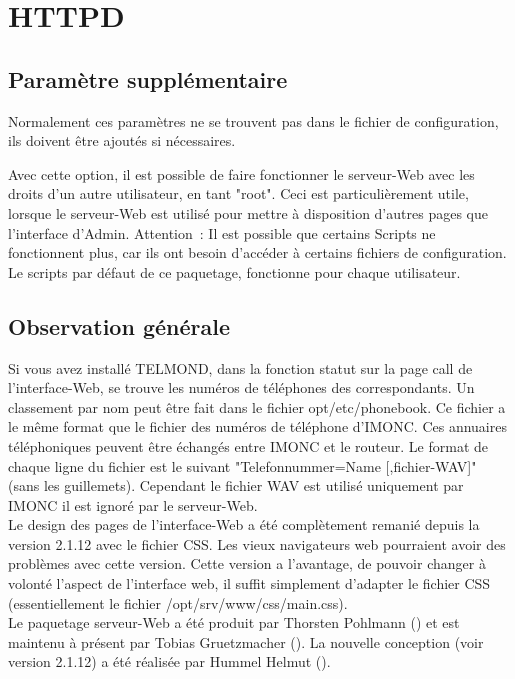 
\section {HTTPD}

\subsection{Paramètre supplémentaire}

Normalement ces paramètres ne se trouvent pas dans le fichier de configuration,
ils doivent être ajoutés si nécessaires.

\begin{description}
    {Avec cette option, il est possible de faire fonctionner le serveur-Web 
    avec les droits d'un autre utilisateur, en tant "root". Ceci est particulièrement 
    utile, lorsque le serveur-Web est utilisé pour mettre à disposition d'autres 
    pages que l'interface d'Admin. Attention~: Il est possible que certains 
    Scripts ne fonctionnent plus, car ils ont besoin d'accéder à certains fichiers 
    de configuration. Le scripts par défaut de ce paquetage, fonctionne pour chaque 
    utilisateur.}
\end{description}

\subsection{Observation générale}

    Si vous avez installé TELMOND, dans la fonction statut sur la page call de 
    l'interface-Web, se trouve les numéros de téléphones des correspondants. Un 
    classement par nom peut être fait dans le fichier opt/etc/phonebook. Ce 
    fichier a le même format que le fichier des numéros de téléphone d'IMONC. 
    Ces annuaires téléphoniques peuvent être échangés entre IMONC et le routeur. 
    Le format de chaque ligne du fichier est le suivant "Telefonnummer=Name 
    [,fichier-WAV]" (sans les guillemets). Cependant le fichier WAV est utilisé 
    uniquement par IMONC il est ignoré par le serveur-Web.\\

    Le design des pages de l'interface-Web a été complètement remanié depuis la 
    version 2.1.12 avec le fichier CSS. Les vieux navigateurs web pourraient avoir 
    des problèmes avec cette version. Cette version a l'avantage, de pouvoir changer 
    à volonté l'aspect de l'interface web, il suffit simplement d'adapter le 
    fichier CSS (essentiellement le fichier /opt/srv/www/css/main.css).\\

    Le paquetage serveur-Web a été produit par Thorsten Pohlmann () 
    et est maintenu à présent par Tobias Gruetzmacher (). 
    La nouvelle conception (voir version 2.1.12) a été réalisée par Hummel Helmut ().

